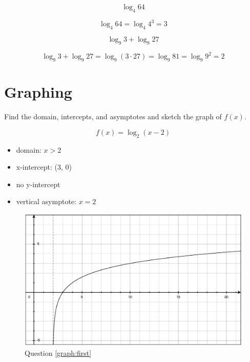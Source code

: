 \documentclass[fleqn,addpoints]{exam}
\begin{document}
\begin{questions}
\label{evaluate:first}
\question[3]
\[
  \log_4 64
\]
\begin{solution}[2 cm]
\[
  \log_4 64 = \log_4 4^3 = 3
\]

\end{solution}


\question[7]
\label{evaluate:last}
\[
  \log_9 3 + \log_9 27
\]
\begin{solution}[3 cm]
\[
  \log_9 3 + \log_9 27 = \log_9 (3 \cdot 27) = \log_9 81 = \log_9 9^2 = 2
\]
\end{solution}

\ifprintanswers
\else
\pagebreak
\fi


\section{Graphing}


\question[10]
Find the domain, intercepts, and asymptotes and sketch the graph of $f(x)$. 

\label{graph:first}
\[
  f(x) = \log_2 (x-2) 
\]

\begin{solution}[5 cm]
\begin{itemize}
\item domain: $x > 2$
\item x-intercept: (3, 0)
\item no y-intercept
\item vertical asymptote: $x=2$
\end{itemize}

\begin{figure}[H]
  \centering
  \includegraphics[scale=.3]{graph_solution.eps}
  \caption*{Question \ref{graph:first}}
\end{figure}


\end{solution}
\end{questions}
\end{document}
